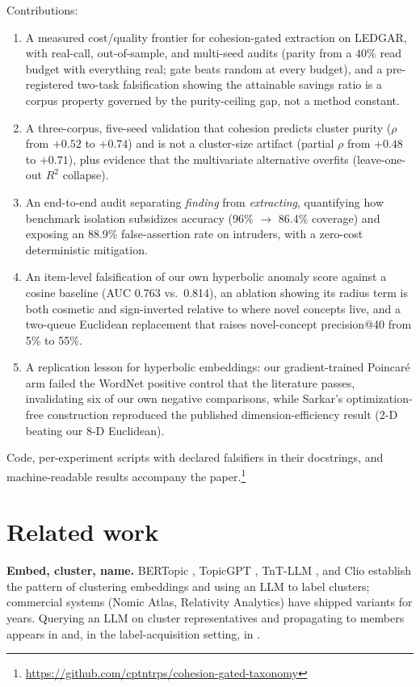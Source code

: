 \documentclass[11pt]{article}
\begin{document}
Contributions:
\begin{enumerate}
  \item A measured cost/quality frontier for cohesion-gated extraction on LEDGAR, with real-call, out-of-sample, and multi-seed audits (parity from a $40\%$ read budget with everything real; gate beats random at every budget), and a pre-registered two-task falsification showing the attainable savings ratio is a corpus property governed by the purity-ceiling gap, not a method constant.
  \item A three-corpus, five-seed validation that cohesion predicts cluster purity ($\rho$ from $+0.52$ to $+0.74$) and is not a cluster-size artifact (partial $\rho$ from $+0.48$ to $+0.71$), plus evidence that the multivariate alternative overfits (leave-one-out $R^2$ collapse).
  \item An end-to-end audit separating \emph{finding} from \emph{extracting}, quantifying how benchmark isolation subsidizes accuracy (96\% $\rightarrow$ 86.4\% coverage) and exposing an 88.9\% false-assertion rate on intruders, with a zero-cost deterministic mitigation.
  \item An item-level falsification of our own hyperbolic anomaly score against a cosine baseline (AUC 0.763 vs.\ 0.814), an ablation showing its radius term is both cosmetic and sign-inverted relative to where novel concepts live, and a two-queue Euclidean replacement that raises novel-concept precision@40 from 5\% to 55\%.
  \item A replication lesson for hyperbolic embeddings: our gradient-trained Poincar\'e arm failed the WordNet positive control that the literature passes, invalidating six of our own negative comparisons, while Sarkar's optimization-free construction reproduced the published dimension-efficiency result (2-D beating our 8-D Euclidean).
\end{enumerate}

Code, per-experiment scripts with declared falsifiers in their docstrings, and machine-readable results accompany the paper.\footnote{\url{https://github.com/cptntrps/cohesion-gated-taxonomy}}

\section{Related work}\label{sec:related}

\textbf{Embed, cluster, name.} BERTopic \cite{bertopic}, TopicGPT \cite{topicgpt}, TnT-LLM \cite{tntllm}, and Clio \cite{clio} establish the pattern of clustering embeddings and using an LLM to label clusters; commercial systems (Nomic Atlas, Relativity Analytics) have shipped variants for years. Querying an LLM on cluster representatives and propagating to members appears in \cite{llmclusterprop} and, in the label-acquisition setting, in \cite{nguyen2004}.
\end{document}
